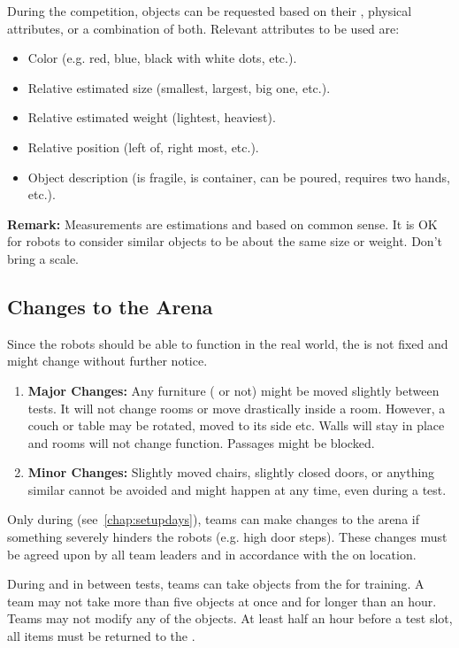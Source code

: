 \noindent During the competition, objects can be requested based on their \ObjectCategory{}, physical attributes, or a combination of both.
Relevant attributes to be used are:
\begin{itemize}
	\item Color (e.g. red, blue, black with white dots, etc.).
	\item Relative estimated size (smallest, largest, big one, etc.).
	\item Relative estimated weight (lightest, heaviest).
	\item Relative position (left of, right most, etc.).
	\item Object description (is fragile, is container, can be poured, requires two hands, etc.).
\end{itemize}

\noindent\textbf{Remark:} Measurements are estimations and based on common sense. It is OK for robots to consider similar objects to be about the same size or weight. Don't bring a scale.


\subsection{Changes to the Arena}
\label{sec:rules:scenario:changes}
Since the robots should be able to function in the real world, the \Arena{} is not fixed and might change without further notice.
\begin{enumerate}
	\item \textbf{Major Changes:}
	Any furniture (\PredefinedLocation{} or not) might be moved slightly between tests. It will not change rooms or move drastically inside a room. However, a couch or table may be rotated, moved to its side etc. Walls will stay in place and rooms will not change function. Passages might be blocked.
	
	\item \textbf{Minor Changes:} Slightly moved chairs, slightly closed doors, or anything similar cannot be avoided and might happen at any time, even during a test.
\end{enumerate}

\noindent Only during \SetupDays{} (see~\ref{chap:setupdays}), teams can make changes to the arena if something severely hinders the robots (e.g. high door steps). These changes must be agreed upon by all team leaders and in accordance with the \TC{} on location.

During \SetupDays{} and in between tests, teams can take objects from the \Arena{} for training. A team may not take more than five objects at once and for longer than an hour. Teams may not modify any of the objects. At least half an hour before a test slot, all items must be returned to the \Arena{}.


